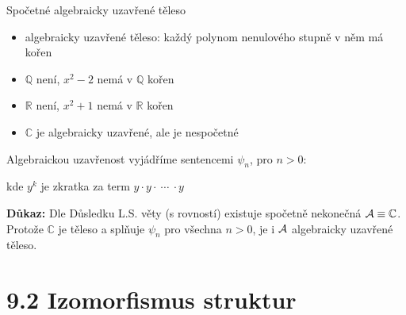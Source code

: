 \documentclass{beamer}
\begin{document}
\begin{frame}{Spočetné algebraicky uzavřené těleso}

    \pause
    \begin{itemize}
        \item \alert{algebraicky uzavřené} těleso: každý polynom nenulového stupně v něm má kořen\pause
        \item $\mathbb Q$ není, $x^2-2$ nemá v $\mathbb Q$ kořen\pause
        \item $\mathbb R$ není, $x^2+1$ nemá v $\mathbb R$ kořen\pause
        \item $\mathbb C$ je algebraicky uzavřené, ale je nespočetné
    \end{itemize}

    \pause
    Algebraickou uzavřenost vyjádříme sentencemi $\psi_n$, pro $n>0$:
    
    \pause

    \pause
    kde $y^k$ je zkratka za term $y\cdot y \cdot\ \cdots\ \cdot y$

    \pause

    \smallskip

    \pause
    \textbf{Důkaz:}
    Dle Důsledku L.S. věty (s rovností) existuje spočetně nekonečná $\mathcal{A}\equiv\mathbb C$. Protože $\mathbb C$ je těleso a splňuje $\psi_n$ pro všechna $n>0$, je i $\mathcal{A}$ algebraicky uzavřené těleso.\hfill\qedsymbol

\end{frame}


\section{9.2 Izomorfismus struktur}
\end{document}
